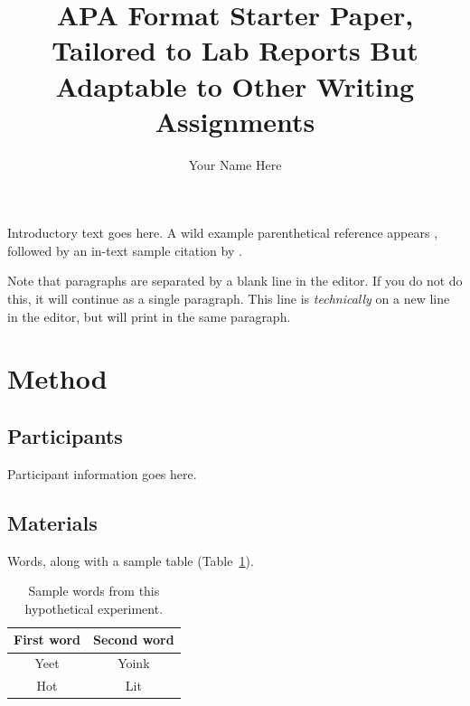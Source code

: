\documentclass[stu,12pt,floatsintext]{apa7}
\title{APA Format Starter Paper, Tailored to Lab Reports But Adaptable to Other Writing Assignments} %
\author{Your Name Here}
\affiliation{Your School}
\begin{document}
\maketitle %


Introductory text goes here. A wild example parenthetical reference appears \parencite{Contributor2023}, followed by an in-text sample citation by \textcite{FullBook2021}.

Note that paragraphs are separated by a blank line in the editor. If you do not do this, it will continue as a single paragraph.
This line is \textit{technically} on a new line in the editor, but will print in the same paragraph.

\section{Method}

\subsection{Participants}

Participant information goes here.

\subsection{Materials}

Words, along with a sample table (Table~\ref{tab:table_words}).

\begin{table}
    \caption{Sample words from this hypothetical experiment.}
    \centering
    \begin{tabular}{cc} %
        \hline 
         First word & Second word \\
         \hline
         Yeet & Yoink \\
         Hot & Lit \\
         \hline
    \end{tabular}
    \label{tab:table_words}
\end{table}
\end{document}
